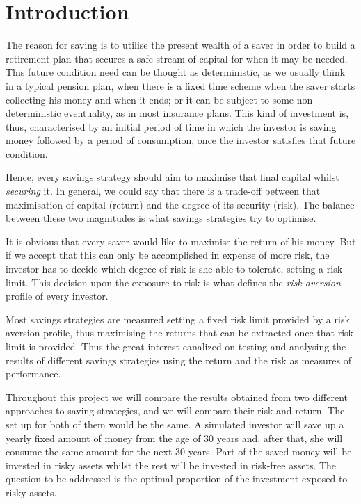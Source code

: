 \section{Introduction}

The reason for saving is to utilise the present wealth of a saver in order to build a retirement plan that secures a safe stream of capital for when it may be needed. This future condition need can be thought as deterministic, as we usually think in a typical pension plan, when there is a fixed time scheme when the saver starts collecting his money and when it ends; or it can be subject to some non-deterministic eventuality, as in most insurance plans. This kind of investment is, thus, characterised by an initial period of time in which the investor is saving money followed by a period of consumption, once the investor satisfies that future condition.

Hence, every savings strategy should aim to maximise that final capital whilst \textit{securing} it. In general, we could say that there is a trade-off between that maximisation of capital (return) and the degree of its security (risk). The balance between these two magnitudes is what savings strategies try to optimise.

It is obvious that every saver would like to maximise the return of his money. But if we accept that this can only be accomplished in expense of more risk, the investor has to decide which degree of risk is she able to tolerate, setting a risk limit. This decision upon the exposure to risk is what defines the \textit{risk aversion} profile of every investor.

Most savings strategies are measured setting a fixed risk limit provided by a risk aversion profile, thus maximising the returns that can be extracted once that risk limit is provided. Thus the great interest canalized on testing and analysing the results of different savings strategies using the return and the risk as measures of performance.


Throughout this project we will compare the results obtained from two different approaches to saving strategies, and we will compare their risk and return. The set up for both of them would be the same. A simulated investor will save up a yearly fixed amount of money from the age of 30 years and, after that, she will consume the same amount for the next 30 years. Part of the saved money will be invested in risky assets whilst the rest will be invested in risk-free assets. The question to be addressed is the optimal proportion of the investment exposed to risky assets.

